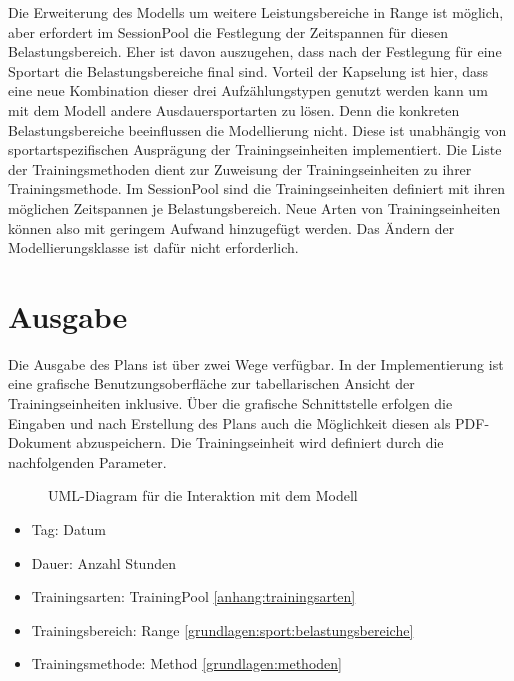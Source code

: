 Die Erweiterung des Modells um weitere Leistungsbereiche in Range ist möglich, aber erfordert im SessionPool die Festlegung der Zeitspannen für diesen Belastungsbereich. Eher ist davon auszugehen, dass nach der Festlegung für eine Sportart die Belastungsbereiche final sind. Vorteil der Kapselung ist hier, dass eine neue Kombination dieser drei Aufzählungstypen genutzt werden kann um mit dem Modell andere Ausdauersportarten zu lösen. Denn die konkreten Belastungsbereiche beeinflussen die Modellierung nicht. Diese ist unabhängig von sportartspezifischen Ausprägung der Trainingseinheiten implementiert. Die Liste der Trainingsmethoden dient zur Zuweisung der Trainingseinheiten zu ihrer Trainingsmethode. Im SessionPool sind die Trainingseinheiten definiert mit ihren möglichen Zeitspannen je Belastungsbereich. Neue Arten von Trainingseinheiten können also mit geringem Aufwand hinzugefügt werden. Das Ändern der Modellierungsklasse ist dafür nicht erforderlich.

\section{Ausgabe}
\label{sec:modellierung:output}
Die Ausgabe des Plans ist über zwei Wege verfügbar. In der Implementierung ist eine grafische Benutzungsoberfläche zur tabellarischen Ansicht der Trainingseinheiten inklusive. Über die grafische Schnittstelle erfolgen die Eingaben und nach Erstellung des Plans auch die Möglichkeit diesen als PDF-Dokument abzuspeichern. Die Trainingseinheit wird definiert durch die nachfolgenden Parameter.
\begin{figure}[h]
    \caption{UML-Diagram für die Interaktion mit dem Modell}
    \label{fig:uml:solver}
\end{figure}
\begin{itemize}
    \item Tag: Datum
    \item Dauer: Anzahl Stunden
    \item Trainingsarten: TrainingPool \ref{anhang:trainingsarten}
    \item Trainingsbereich: Range \ref{grundlagen:sport:belastungsbereiche}
    \item Trainingsmethode: Method \ref{grundlagen:methoden}
\end{itemize}

